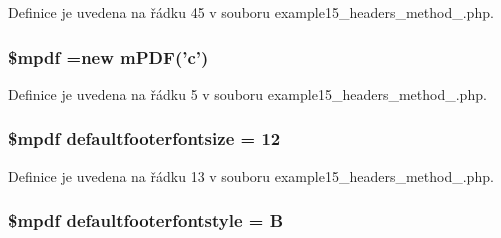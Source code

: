 Definice je uvedena na řádku 45 v souboru example15\-\_\-headers\-\_\-method\-\_.\-php.

\hypertarget{example15__headers__method__1_8php_ad028f81910d6cbab9b184d2214b3a8f8}{
\subsubsection[{\$mpdf}]{\setlength{\rightskip}{0pt plus 5cm}\$mpdf =new {\bf m\-P\-D\-F}('c')}}\label{example15__headers__method__1_8php_ad028f81910d6cbab9b184d2214b3a8f8}


Definice je uvedena na řádku 5 v souboru example15\-\_\-headers\-\_\-method\-\_.\-php.

\hypertarget{example15__headers__method__1_8php_af908f917e35d865734d31eecf6841116}{
\subsubsection[{defaultfooterfontsize}]{\setlength{\rightskip}{0pt plus 5cm}\$mpdf defaultfooterfontsize = 12}}\label{example15__headers__method__1_8php_af908f917e35d865734d31eecf6841116}


Definice je uvedena na řádku 13 v souboru example15\-\_\-headers\-\_\-method\-\_.\-php.

\hypertarget{example15__headers__method__1_8php_a6a30e6faeafbd33aa10828e7898a54ec}{
\subsubsection[{defaultfooterfontstyle}]{\setlength{\rightskip}{0pt plus 5cm}\$mpdf defaultfooterfontstyle = B}}\label{example15__headers__method__1_8php_a6a30e6faeafbd33aa10828e7898a54ec}


